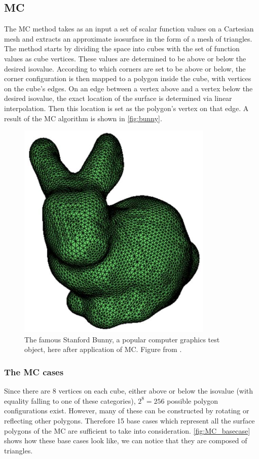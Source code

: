 \subsection{\Acl{MC}} 
The \acf{MC} method \cite{Marching2006} takes as an input a set of scalar function values on a Cartesian mesh and extracts an approximate isosurface in the form of a mesh of triangles. The method starts by dividing the space into cubes with the set of function values as cube vertices. These values are determined to be above or below the desired isovalue. According to which corners are set to be above or below, the corner configuration is then mapped to a polygon inside the cube, with vertices on the cube's edges. On an edge between a vertex above and a vertex below the desired isovalue, the exact location of the surface is determined via linear interpolation. Then this location is set as the polygon's vertex on that edge. A result of the \ac{MC} algorithm is shown in \autoref{fig:bunny}.

\begin{figure}
\centering
   \includegraphics[width=.25\textwidth]{Pictures/SurfaceReconstruction/Bunny}
   \caption{The famous Stanford Bunny, a popular computer graphics test object, here after application of \ac{MC}. Figure from \cite{}. }
   \label{fig:bunny}
\end{figure}

\subsubsection{The \acl{MC} cases}
Since there are 8 vertices on each cube, either above or below the isovalue (with equality falling to one of these categories), $2^8=256$ possible polygon configurations exist. However, many of these can be constructed by rotating or reflecting other polygons. Therefore 15 base cases which represent all the surface polygons of the \acl{MC} are sufficient to take into consideration. \autoref{fig:MC_basecase} shows how these base cases look like, we can notice that they are composed of triangles. 

